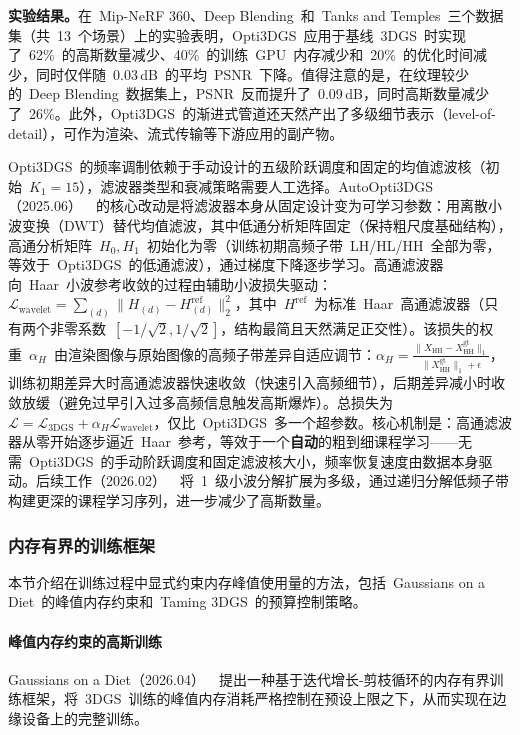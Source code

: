 \textbf{实验结果。}在~Mip-NeRF 360、Deep Blending~和~Tanks and Temples~三个数据集（共~13~个场景）上的实验表明，Opti3DGS~应用于基线~3DGS~时实现了~62\%~的高斯数量减少、40\%~的训练~GPU~内存减少和~20\%~的优化时间减少，同时仅伴随~0.03\,dB~的平均~PSNR~下降。值得注意的是，在纹理较少的~Deep Blending~数据集上，PSNR~反而提升了~0.09\,dB，同时高斯数量减少了~26\%。此外，Opti3DGS~的渐进式管道还天然产出了多级细节表示（level-of-detail），可作为渲染、流式传输等下游应用的副产物。

Opti3DGS~的频率调制依赖于手动设计的五级阶跃调度和固定的均值滤波核（初始~$K_1{=}15$），滤波器类型和衰减策略需要人工选择。AutoOpti3DGS（2025.06）~\cite{2506_23042}~的核心改动是将滤波器本身从固定设计变为可学习参数：用离散小波变换（DWT）替代均值滤波，其中低通分析矩阵固定（保持粗尺度基础结构），高通分析矩阵~$H_0, H_1$~初始化为零（训练初期高频子带~LH/HL/HH~全部为零，等效于~Opti3DGS~的低通滤波），通过梯度下降逐步学习。高通滤波器向~Haar~小波参考收敛的过程由辅助小波损失驱动：$\mathcal{L}_\text{wavelet} = \sum_{(d)} \| H_{(d)} - H^\text{ref}_{(d)} \|_2^2$，其中~$H^\text{ref}$~为标准~Haar~高通滤波器（只有两个非零系数~$[-1/\sqrt{2}, 1/\sqrt{2}]$，结构最简且天然满足正交性）。该损失的权重~$\alpha_H$~由渲染图像与原始图像的高频子带差异自适应调节：$\alpha_H = \frac{\| X_\text{HH} - X^\text{gt}_\text{HH} \|_1}{\| X^\text{gt}_\text{HH} \|_1 + \epsilon}$，训练初期差异大时高通滤波器快速收敛（快速引入高频细节），后期差异减小时收敛放缓（避免过早引入过多高频信息触发高斯爆炸）。总损失为~$\mathcal{L} = \mathcal{L}_\text{3DGS} + \alpha_H \mathcal{L}_\text{wavelet}$，仅比~Opti3DGS~多一个超参数。核心机制是：高通滤波器从零开始逐步逼近~Haar~参考，等效于一个\textbf{自动}的粗到细课程学习——无需~Opti3DGS~的手动阶跃调度和固定滤波核大小，频率恢复速度由数据本身驱动。后续工作（2026.02）~\cite{2602_14199}~将~1~级小波分解扩展为多级，通过递归分解低频子带构建更深的课程学习序列，进一步减少了高斯数量。

\subsubsection{内存有界的训练框架}

本节介绍在训练过程中显式约束内存峰值使用量的方法，包括~Gaussians on a Diet~的峰值内存约束和~Taming 3DGS~的预算控制策略。

\paragraph{峰值内存约束的高斯训练}

Gaussians on a Diet（2026.04）~\cite{2604_20046}~提出一种基于迭代增长-剪枝循环的内存有界训练框架，将~3DGS~训练的峰值内存消耗严格控制在预设上限之下，从而实现在边缘设备上的完整训练。

